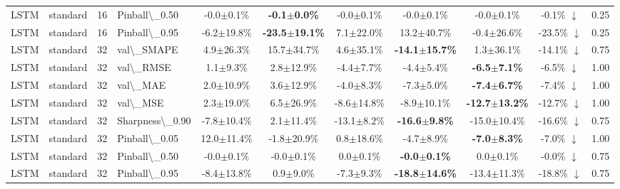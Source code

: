 \begin{table}[t]
\begin{tabular}{l l r l c c c c c c c}
LSTM & standard & 16 & Pinball\textbackslash{}_0.50 & -0.0$\pm$0.1\% & \textbf{-0.1$\pm$0.0\%} & -0.0$\pm$0.1\% & -0.0$\pm$0.1\% & -0.0$\pm$0.1\% & -0.1\% $\downarrow$ & 0.25 \\
LSTM & standard & 16 & Pinball\textbackslash{}_0.95 & -6.2$\pm$19.8\% & \textbf{-23.5$\pm$19.1\%} & 7.1$\pm$22.0\% & 13.2$\pm$40.7\% & -0.4$\pm$26.6\% & -23.5\% $\downarrow$ & 0.25 \\
LSTM & standard & 32 & val\textbackslash{}_SMAPE & 4.9$\pm$26.3\% & 15.7$\pm$34.7\% & 4.6$\pm$35.1\% & \textbf{-14.1$\pm$15.7\%} & 1.3$\pm$36.1\% & -14.1\% $\downarrow$ & 0.75 \\
LSTM & standard & 32 & val\textbackslash{}_RMSE & 1.1$\pm$9.3\% & 2.8$\pm$12.9\% & -4.4$\pm$7.7\% & -4.4$\pm$5.4\% & \textbf{-6.5$\pm$7.1\%} & -6.5\% $\downarrow$ & 1.00 \\
LSTM & standard & 32 & val\textbackslash{}_MAE & 2.0$\pm$10.9\% & 3.6$\pm$12.9\% & -4.0$\pm$8.3\% & -7.3$\pm$5.0\% & \textbf{-7.4$\pm$6.7\%} & -7.4\% $\downarrow$ & 1.00 \\
LSTM & standard & 32 & val\textbackslash{}_MSE & 2.3$\pm$19.0\% & 6.5$\pm$26.9\% & -8.6$\pm$14.8\% & -8.9$\pm$10.1\% & \textbf{-12.7$\pm$13.2\%} & -12.7\% $\downarrow$ & 1.00 \\
LSTM & standard & 32 & Sharpness\textbackslash{}_0.90 & -7.8$\pm$10.4\% & 2.1$\pm$11.4\% & -13.1$\pm$8.2\% & \textbf{-16.6$\pm$9.8\%} & -15.0$\pm$10.4\% & -16.6\% $\downarrow$ & 0.75 \\
LSTM & standard & 32 & Pinball\textbackslash{}_0.05 & 12.0$\pm$11.4\% & -1.8$\pm$20.9\% & 0.8$\pm$18.6\% & -4.7$\pm$8.9\% & \textbf{-7.0$\pm$8.3\%} & -7.0\% $\downarrow$ & 1.00 \\
LSTM & standard & 32 & Pinball\textbackslash{}_0.50 & -0.0$\pm$0.1\% & -0.0$\pm$0.1\% & 0.0$\pm$0.1\% & \textbf{-0.0$\pm$0.1\%} & 0.0$\pm$0.1\% & -0.0\% $\downarrow$ & 0.75 \\
LSTM & standard & 32 & Pinball\textbackslash{}_0.95 & -8.4$\pm$13.8\% & 0.9$\pm$9.0\% & -7.3$\pm$9.3\% & \textbf{-18.8$\pm$14.6\%} & -13.4$\pm$11.3\% & -18.8\% $\downarrow$ & 0.75 \\
\bottomrule
\end{tabular}
\end{table}